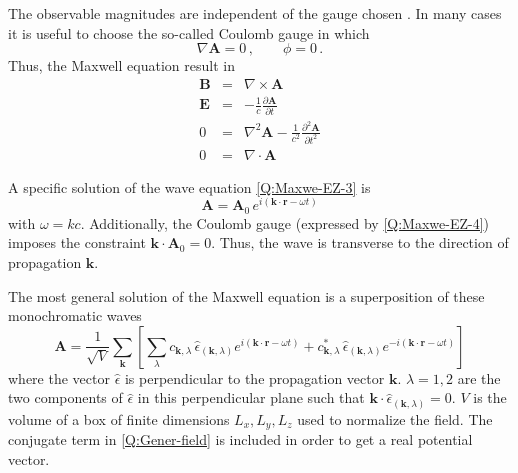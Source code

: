 The observable magnitudes are independent of the gauge chosen \autocite{Galindo1990_QMvI}. In many cases it is useful to choose the so-called Coulomb gauge in which
\begin{equation}\label{Q:Coul-Gaug}
  \nabla \bm{A} = 0 \, , \qquad \phi = 0 \,.
\end{equation}
%
Thus, the Maxwell equation result in
\begin{eqnarray}\label{Q:Maxwe-EZ-2}
\bm{B} &=& \nabla {\times} \bm{A} \label{Q:Maxwe-EZ-1}\\
\bm{E} &=& -\frac{1}{c} \frac{\partial \bm{A}}{\partial t}
\\
0 &=& \nabla^{2} \bm{A} - \frac{1}{c^{2}} \frac{\partial^{2}
\bm{A}}{\partial t^{2}} \label{Q:Maxwe-EZ-3}
\\
  0 &=& \nabla  \cdot \bm{A} \label{Q:Maxwe-EZ-4}
\end{eqnarray}

A specific solution of the wave equation \ref{Q:Maxwe-EZ-3} is
\begin{equation}\label{Q:Monoc-field}
\bm{A} = \bm{A}_{0}\, e^{i (\bm{k} \cdot \bm{r} - \omega t)} 
\end{equation}
%
with $\omega = k c$. Additionally, the Coulomb gauge (expressed by \ref{Q:Maxwe-EZ-4}) imposes the constraint $\bm{k} \cdot \bm{A}_{0} =
0$. Thus, the wave is transverse to the direction of propagation $\bm{k}$.

The most general solution of the Maxwell equation is a superposition of these monochromatic waves
\begin{equation}\label{Q:Gener-field}
\bm{A} = \frac{1}{\sqrt{V}}\sum_{\bm{k}} \left[ \sum_{\lambda} c_{\bm{k},\lambda} \, \hat{\epsilon}_{(\bm{k},\lambda)} e^{i (\bm{k} \cdot \bm{r} - \omega t)} + c^{*}_{\bm{k},\lambda} \, \hat{\epsilon}_{(\bm{k},\lambda)} e^{- i (\bm{k} \cdot \bm{r} - \omega t) } \right] 
\end{equation}
%
where the vector $\hat{\epsilon}$ is perpendicular to the propagation vector $\bm{k}$. $\lambda=1,2$ are the two components of $\hat{\epsilon}$ in this perpendicular plane such that $\bm{k} \cdot \hat{\epsilon}_{(\bm{k},\lambda)}=0$. $V$ is the volume of a box of finite dimensions $L_{x},L_{y},L_{z}$ used to normalize the field. The conjugate term in \ref{Q:Gener-field} is included in order to get a real potential vector.

